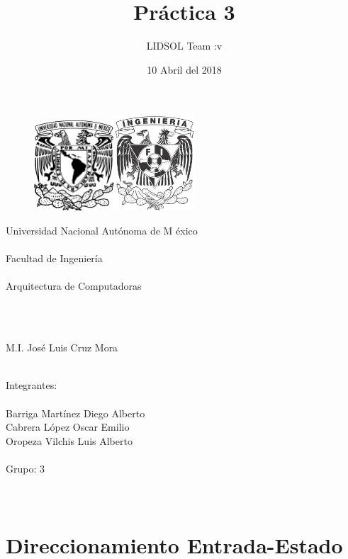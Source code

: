 \documentclass[12pt]{article}
\author{LIDSOL Team :v}
\title{Pr\'actica 3}
\date{10 Abril del 2018}
\def\universidad{Universidad Nacional Aut\'onoma de M \'exico}
\def\facultad{Facultad de Ingenier\'ia}
\def\materia{Arquitectura de Computadoras}
\def\grupo{Grupo: 3}
\def\profesor{M.I. Jos\'e Luis Cruz Mora}
\def\luis{Oropeza Vilchis Luis Alberto}
\def\diego{Barriga Mart\'inez Diego Alberto}
\def\emilio{Cabrera L\'opez Oscar Emilio}
\begin{document}

\begin{figure}
	\begin{flushleft}
		\includegraphics[width=3cm]{unam}\hfill 				\includegraphics[width=3cm]{fi2}
	\end{flushleft}
\end{figure}

\begin{center}
	\Huge \universidad \\
	\hfill \\
	\facultad \\
	\hfill \\
    \materia\par
    \hfill \\
    \@title\par
    \hfill \\
    \profesor\par
    \hfill \\
    Integrantes:
    \hfill \\
    \hfill \\
    \diego \\
    \emilio \\
    \luis \\
    \hfill \\
    \grupo \\
    \hfill \\
    \@date \\
\end{center}

\newpage
{}

\section{Direccionamiento Entrada-Estado}
\end{document}
